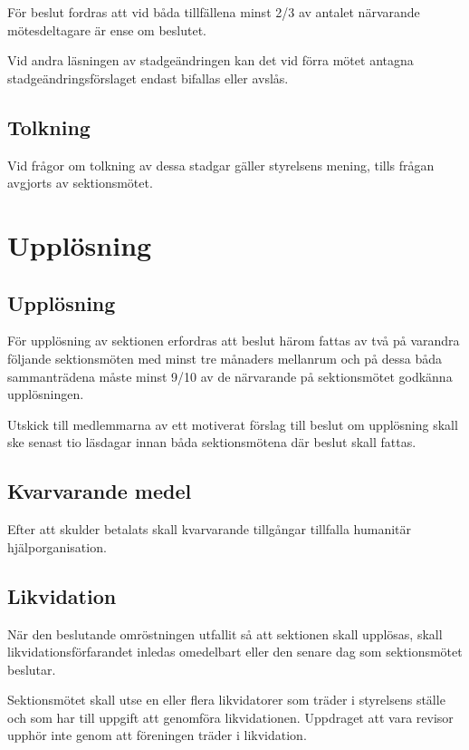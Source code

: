 \documentclass{datateknologsektionen-document}
\begin{document}
För beslut fordras att vid båda tillfällena minst 2/3 av antalet närvarande mötesdeltagare
är ense om beslutet.

Vid andra läsningen av stadgeändringen kan det vid förra mötet antagna
stadgeändringsförslaget endast bifallas eller avslås.

\subsection{Tolkning}
Vid frågor om tolkning av dessa stadgar gäller styrelsens mening, tills frågan avgjorts av
sektionsmötet.

\section{Upplösning}
\subsection{Upplösning}
För upplösning av sektionen erfordras att beslut härom fattas av två på varandra följande
sektionsmöten med minst tre månaders mellanrum och på dessa båda sammanträdena
måste minst 9/10 av de närvarande på sektionsmötet godkänna upplösningen.

Utskick till medlemmarna av ett motiverat förslag till beslut om upplösning skall ske
senast tio läsdagar innan båda sektionsmötena där beslut skall fattas.

\subsection{Kvarvarande medel}
Efter att skulder betalats skall kvarvarande tillgångar tillfalla humanitär
hjälporganisation.

\subsection{Likvidation}
När den beslutande omröstningen utfallit så att sektionen skall upplösas, skall
likvidationsförfarandet inledas omedelbart eller den senare dag som sektionsmötet
beslutar.

Sektionsmötet skall utse en eller flera likvidatorer som träder i styrelsens ställe och som
har till uppgift att genomföra likvidationen. Uppdraget att vara revisor upphör inte genom
att föreningen träder i likvidation.
\end{document}
